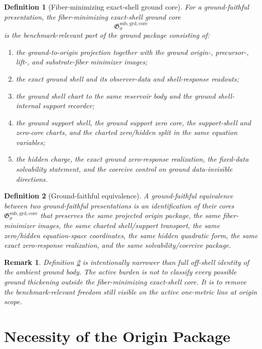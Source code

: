 \documentclass[11pt]{article}
\newcommand{\GroundCore}{\mathfrak G^{\mathrm{sub,grd,core}}}
\newtheorem{definition}{Definition}
\newtheorem{remark}{Remark}
\begin{document}
\begin{definition}[Fiber-minimizing exact-shell ground core]
\label{def:core}
For a ground-faithful presentation, the \emph{fiber-minimizing exact-shell ground core}
\[
\GroundCore_{\sigma}
\]
is the benchmark-relevant part of the ground package consisting of:
\begin{enumerate}
    \item the ground-to-origin projection together with the ground origin-, precursor-, lift-, and substrate-fiber minimizer images;
    \item the exact ground shell and its observer-data and shell-response readouts;
    \item the ground shell chart to the same reservoir body and the ground shell-internal support recorder;
    \item the ground support shell, the ground support zero core, the support-shell and zero-core charts, and the charted zero/hidden split in the same equation variables;
    \item the hidden charge, the exact ground zero-response realization, the fixed-data solvability statement, and the coercive control on ground data-invisible directions.
\end{enumerate}
\end{definition}

\begin{definition}[Ground-faithful equivalence]
\label{def:equiv}
A \emph{ground-faithful equivalence} between two ground-faithful presentations is an identification of their cores \(\GroundCore_{\sigma}\) that preserves the same projected origin package, the same fiber-minimizer images, the same charted shell/support transport, the same zero/hidden equation-space coordinates, the same hidden quadratic form, the same exact zero-response realization, and the same solvability/coercive package.
\end{definition}

\begin{remark}
Definition \ref{def:equiv} is intentionally narrower than full off-shell identity of the ambient ground body. The active burden is not to classify every possible ground thickening outside the fiber-minimizing exact-shell core. It is to remove the benchmark-relevant freedom still visible on the active one-metric line at origin scope.
\end{remark}

\section{Necessity of the Origin Package}
\end{document}
